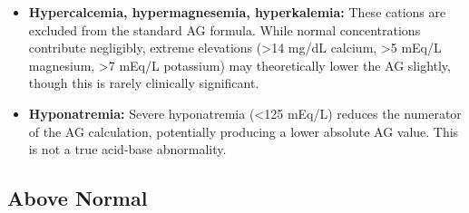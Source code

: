 \begin{itemize}
  \item \textbf{Hypercalcemia, hypermagnesemia, hyperkalemia:} These cations are excluded from the standard AG formula. While normal concentrations contribute negligibly, extreme elevations (>14 mg/dL calcium, >5 mEq/L magnesium, >7 mEq/L potassium) may theoretically lower the AG slightly, though this is rarely clinically significant.
  \item \textbf{Hyponatremia:} Severe hyponatremia (<125 mEq/L) reduces the numerator of the AG calculation, potentially producing a lower absolute AG value. This is not a true acid-base abnormality.
\end{itemize}

\subsection*{Above Normal}
